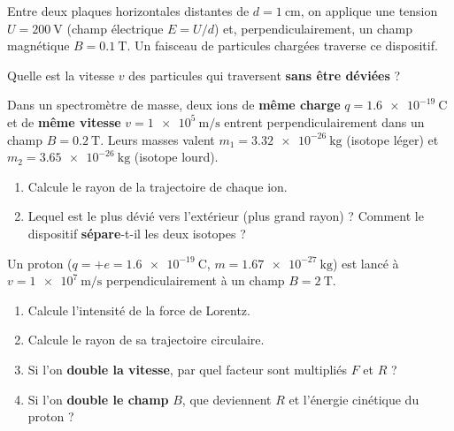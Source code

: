 \documentclass[11pt,a4paper]{article}
\newcommand{\vv}[1]{\vec{#1}}\newcommand{\ds}{\displaystyle}
\begin{document}
\begin{exo}
Entre deux plaques horizontales distantes de $d=\qty{1}{\centi\metre}$, on applique une tension
$U=\qty{200}{\volt}$ (champ électrique $E=U/d$) et, perpendiculairement, un champ magnétique
$B=\qty{0.1}{\tesla}$. Un faisceau de particules chargées traverse ce dispositif.
\begin{center}
\end{center}
Quelle est la vitesse $v$ des particules qui traversent \textbf{sans être déviées} ?
\end{exo}

\begin{exo}
Dans un spectromètre de masse, deux ions de \textbf{même charge} $q=\qty{1.6e-19}{\coulomb}$ et de
\textbf{même vitesse} $v=\qty{1e5}{\metre\per\second}$ entrent perpendiculairement dans un champ
$B=\qty{0.2}{\tesla}$. Leurs masses valent $m_1=\qty{3.32e-26}{\kilogram}$ (isotope léger) et
$m_2=\qty{3.65e-26}{\kilogram}$ (isotope lourd).
\begin{enumerate}[label=\alph*)]
  \item Calcule le rayon de la trajectoire de chaque ion.
  \item Lequel est le plus dévié vers l'extérieur (plus grand rayon) ? Comment le dispositif
        \textbf{sépare}-t-il les deux isotopes ?
\end{enumerate}
\end{exo}

\begin{exo}
Un proton ($q=+e=\qty{1.6e-19}{\coulomb}$, $m=\qty{1.67e-27}{\kilogram}$) est lancé à
$v=\qty{1e7}{\metre\per\second}$ perpendiculairement à un champ $B=\qty{2}{\tesla}$.
\begin{enumerate}[label=\alph*)]
  \item Calcule l'intensité de la force de Lorentz.
  \item Calcule le rayon de sa trajectoire circulaire.
  \item Si l'on \textbf{double la vitesse}, par quel facteur sont multipliés $F$ et $R$ ?
  \item Si l'on \textbf{double le champ} $B$, que deviennent $R$ et l'énergie cinétique du proton ?
\end{enumerate}
\end{exo}
\end{document}
